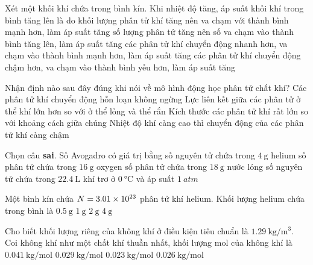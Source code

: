 \begin{ex}
	Xét một khối khí chứa trong bình kín. Khi nhiệt độ tăng, áp suất khối khí trong bình tăng lên là do
	\choice
	{khối lượng phân tử khí tăng nên va chạm với thành bình mạnh hơn, làm áp suất tăng}
	{số lượng phân tử tăng nên số va chạm vào thành bình tăng lên, làm áp suất tăng}
	{\True các phân tử khí chuyển động nhanh hơn, va chạm vào thành bình mạnh hơn, làm áp suất tăng}
	{các phân tử khí chuyển động chậm hơn, va chạm vào thành bình yếu hơn, làm áp suất tăng}
	\loigiai{}
\end{ex}
\begin{ex}
	Nhận định nào sau đây đúng khi nói về mô hình động học phân tử chất khí?
	\choice
	{\True Các phân tử khí chuyển động hỗn loạn không ngừng}
	{Lực liên kết giữa các phân tử ở thể khí lớn hơn so với ở thể lỏng và thể rắn}
	{Kích thước các phân tử khí rất lớn so với khoảng cách giữa chúng}
	{Nhiệt độ khí càng cao thì chuyển động của các phân tử khí càng chậm}
	\loigiai{}
\end{ex}
\begin{ex}
Chọn câu \textbf{sai}. Số Avogadro có giá trị bằng	
	\choice
	{số nguyên tử chứa trong $\SI{4}{\gram}$ helium}
	{\True số phân tử chứa trong $\SI{16}{\gram}$ oxygen}
	{số phân tử chứa trong $\SI{18}{\gram}$ nước lỏng}
	{số nguyên tử chứa trong $\SI{22.4}{\liter}$ khí trơ ở $\SI{0}{\celsius}$ và áp suất $\SI{1}{atm}$}
	\loigiai{}
\end{ex}
\begin{ex}
Một bình kín chứa $N=\SI{3.01E23}{}$ phân tử khí helium. Khối lượng helium chứa trong bình là	
	\choice
	{$\SI{0.5}{\gram}$}
	{$\SI{1}{\gram}$}
	{\True $\SI{2}{\gram}$}
	{$\SI{4}{\gram}$}
	\loigiai{}
\end{ex}
\begin{ex}
	Cho biết khối lượng riêng của không khí ở điều kiện tiêu chuẩn là $\SI{1.29}{\kilogram/\meter^3}$. Coi không khí như một chất khí thuần nhất, khối lượng mol của không khí là
	\choice
	{$\SI{0.041}{\kilogram/\mole}$}
	{\True $\SI{0.029}{\kilogram/\mole}$}
	{$\SI{0.023}{\kilogram/\mole}$}
	{$\SI{0.026}{\kilogram/\mole}$}
\end{ex}
